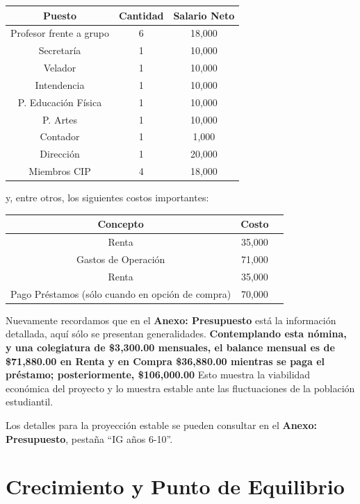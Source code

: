 \documentclass[10pt,letterpaper,oneside]{book}
\begin{document}
\begin{center}
\begin{tabular}{|c|c|c|}
\hline 
{\bf Puesto} & {\bf Cantidad} & {\bf Salario Neto} \\ 
\hline 
Profesor frente a grupo & 6 & 18,000 \\ 
\hline 
Secretaría & 1 & 10,000 \\ 
\hline 
Velador & 1 & 10,000 \\ 
\hline 
Intendencia & 1 & 10,000 \\ 
\hline 
P. Educación Física & 1 & 10,000 \\ 
\hline 
P. Artes & 1 & 10,000 \\ 
\hline 
Contador & 1 & 1,000 \\ 
\hline 
Dirección & 1 & 20,000 \\ 
\hline 
Miembros CIP & 4 & 18,000 \\ 
\hline 
\end{tabular} 
\end{center}
y, entre otros, los siguientes costos importantes:

\begin{center}
\begin{tabular}{|c|c|c|}
\hline 
{\bf Concepto} & {\bf Costo}  \\ 
\hline 
Renta & 35,000 \\ 
\hline 
Gastos de Operación & 71,000 \\ 
\hline 
Renta & 35,000 \\ 
\hline 
Pago Préstamos (sólo cuando en opción de compra) & 70,000 \\ 
\hline 
\end{tabular} 
\end{center}
\vspace{0.3cm}
Nuevamente recordamos que en el {\bf Anexo: Presupuesto} está la información detallada, aquí sólo se presentan generalidades. {\bf\large \color{red} Contemplando esta nómina, y una colegiatura de \$3,300.00 mensuales, el balance mensual es de \$71,880.00 en Renta y en Compra \$36,880.00  mientras se paga el préstamo; posteriormente, \$106,000.00}
Esto muestra la viabilidad económica del proyecto y lo muestra estable ante las fluctuaciones de la población estudiantil.
\vspace{0.3cm}

Los detalles para la proyección estable se pueden consultar en el {\bf Anexo: Presupuesto}, pestaña ``IG años 6-10''.


\section{Crecimiento y Punto de Equilibrio}
\end{document}

